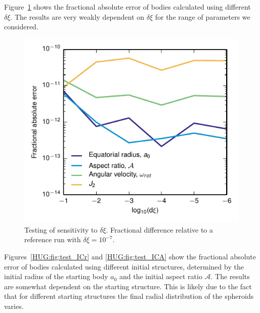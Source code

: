 \documentclass[11pt, oneside]{article}   	%
\begin{document}
Figure~\ref{HUG:fig:test_dxi} shows the fractional absolute error of bodies calculated using different $\delta\xi$. The results are very weakly dependent on $\delta\xi$ for the range of parameters we considered.


\begin{figure}[]
   \centering
   \includegraphics[]{Figures/Test_dxi.pdf} 
   \caption{Testing of sensitivity to $\delta \xi$. Fractional difference relative to a reference run with $\delta \xi = 10^{-7}$.}
   \label{HUG:fig:test_dxi}
\end{figure}

Figures~\ref{HUG:fig:test_ICr} and \ref{HUG:fig:test_ICA} show the fractional absolute error of bodies calculated using different initial structures, determined by the initial radius of the starting body $a_0$ and the initial aspect ratio $\mathcal{A}$. The results are somewhat dependent on the starting structure. This is likely due to the fact that for different starting structures the final radial distribution of the spheroids varies. 
\end{document}
